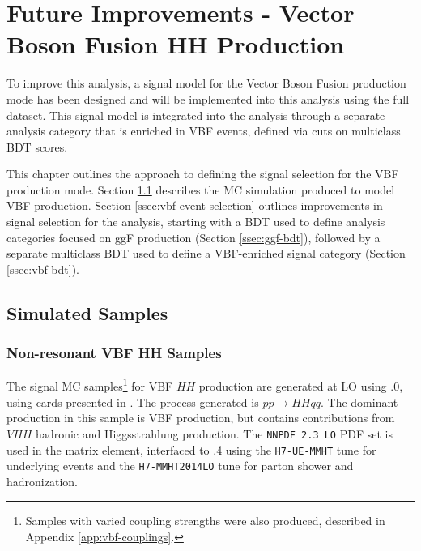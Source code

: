\chapter{Future Improvements - Vector Boson Fusion HH Production} \label{ch:vbf}

To improve this analysis, a signal model for the Vector Boson Fusion production mode has been designed and will be implemented into this analysis using the full \RunTwo dataset. This signal model is integrated into the analysis through a separate analysis category that is enriched in VBF events, defined via cuts on multiclass \gls{BDT} scores.

This chapter outlines the approach to defining the signal selection for the \gls{VBF} production mode. Section \ref{sec:vbf-samples} describes the \gls{MC} simulation produced to model VBF \hhyybb production. Section \ref{ssec:vbf-event-selection} outlines improvements in signal selection for the analysis, starting with a \gls{BDT} used to define analysis categories focused on ggF \hh production (Section \ref{ssec:ggf-bdt}), followed by a separate multiclass \gls{BDT} used to define a VBF-enriched signal category (Section \ref{ssec:vbf-bdt}).

\section{Simulated Samples} \label{sec:vbf-samples}

\subsection{Non-resonant VBF HH Samples} \label{ssec:vbf-samples-production}

The signal MC samples\footnote{Samples with varied coupling strengths were also produced, described in Appendix \ref{app:vbf-couplings}.} for VBF $HH$ production are generated at LO using .0, using cards presented in \cite{vbfhh}. The process generated is $pp \rightarrow HHqq$. The dominant production in this sample is VBF \hh production, but contains contributions from $VHH$  hadronic and Higgsstrahlung production. The \texttt{NNPDF 2.3 LO} PDF set \cite{NNPDF} is used in the matrix element, interfaced to .4 using the \texttt{H7-UE-MMHT} tune for underlying events and the \texttt{H7-MMHT2014LO} tune for parton shower and hadronization.

